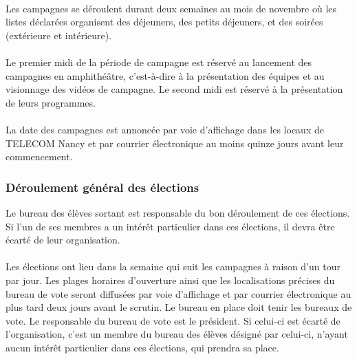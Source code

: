 \documentclass{article} %
\begin{document}
                \paragraph{}
				Les campagnes se déroulent durant deux semaines au mois de
				novembre où les listes déclarées organisent des déjeuners, des
				petits déjeuners, et des soirées (extérieure et intérieure).
				
				\paragraph{}
				Le premier midi de la période de campagne est réservé au
				lancement des campagnes en amphithéâtre, c’est-à-dire à la
				présentation des équipes et au visionnage des vidéos de campagne.
				Le second midi est réservé à la présentation de leurs
				programmes.

                \paragraph{}
				La date des campagnes est annoncée par voie d’affichage dans les
				locaux de TELECOM Nancy et par courrier électronique au moins
				quinze jours avant leur commencement.

			\subsubsection{Déroulement général des élections}
\label{ssub:deroulement_general_des_elections}

				Le bureau des élèves sortant est responsable du bon déroulement
				de ces élections. Si l'un de ses membres a un intérêt
				particulier dans ces élections, il devra être écarté de leur
				organisation.

                \paragraph{}
				Les élections ont lieu dans la semaine qui suit les campagnes à
				raison d’un tour par jour. Les plages horaires d’ouverture ainsi
				que les localisations précises du bureau de vote seront
				diffusées par voie d’affichage et par courrier électronique au
				plus tard deux jours avant le scrutin. Le bureau en place doit
				tenir les bureaux de vote. Le responsable du bureau de vote est
				le président. Si celui-ci est écarté de l’organisation, c'est un
				membre du bureau des élèves désigné par celui-ci, n'ayant aucun
				intérêt particulier dans ces élections, qui prendra sa place.
\end{document}
